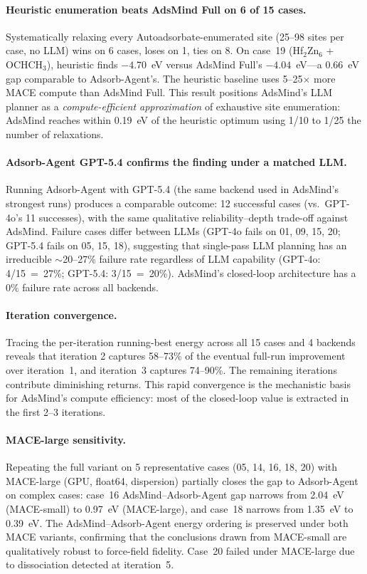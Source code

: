 \paragraph{Heuristic enumeration beats AdsMind Full on 6 of 15 cases.}
Systematically relaxing every Autoadsorbate-enumerated site (25--98 sites per case, no LLM) wins on 6 cases, loses on 1, ties on 8.
On case~19 (Hf$_2$Zn$_6$ + OCHCH$_3$), heuristic finds $-4.70$~eV versus AdsMind Full's $-4.04$~eV---a 0.66~eV gap comparable to Adsorb-Agent's.
The heuristic baseline uses 5--25$\times$ more MACE compute than AdsMind Full.
This result positions AdsMind's LLM planner as a \textit{compute-efficient approximation} of exhaustive site enumeration: AdsMind reaches within 0.19~eV of the heuristic optimum using 1/10 to 1/25 the number of relaxations.

\paragraph{Adsorb-Agent GPT-5.4 confirms the finding under a matched LLM.}
Running Adsorb-Agent with GPT-5.4 (the same backend used in AdsMind's strongest runs) produces a comparable outcome: 12 successful cases (vs.\ GPT-4o's 11 successes), with the same qualitative reliability--depth trade-off against AdsMind.
Failure cases differ between LLMs (GPT-4o fails on 01, 09, 15, 20; GPT-5.4 fails on 05, 15, 18), suggesting that single-pass LLM planning has an irreducible $\sim$20--27\% failure rate regardless of LLM capability (GPT-4o: 4/15~=~27\%; GPT-5.4: 3/15~=~20\%).
AdsMind's closed-loop architecture has a 0\% failure rate across all backends.

\paragraph{Iteration convergence.}
Tracing the per-iteration running-best energy across all 15 cases and 4 backends reveals that iteration 2 captures 58--73\% of the eventual full-run improvement over iteration~1, and iteration~3 captures 74--90\%.
The remaining iterations contribute diminishing returns.
This rapid convergence is the mechanistic basis for AdsMind's compute efficiency: most of the closed-loop value is extracted in the first 2--3 iterations.

\paragraph{MACE-large sensitivity.}
Repeating the full variant on 5 representative cases (05, 14, 16, 18, 20) with MACE-large (GPU, float64, dispersion) partially closes the gap to Adsorb-Agent on complex cases: case~16 AdsMind--Adsorb-Agent gap narrows from 2.04~eV (MACE-small) to 0.97~eV (MACE-large), and case~18 narrows from 1.35~eV to 0.39~eV.
The AdsMind--Adsorb-Agent energy ordering is preserved under both MACE variants, confirming that the conclusions drawn from MACE-small are qualitatively robust to force-field fidelity.
Case~20 failed under MACE-large due to dissociation detected at iteration~5.

